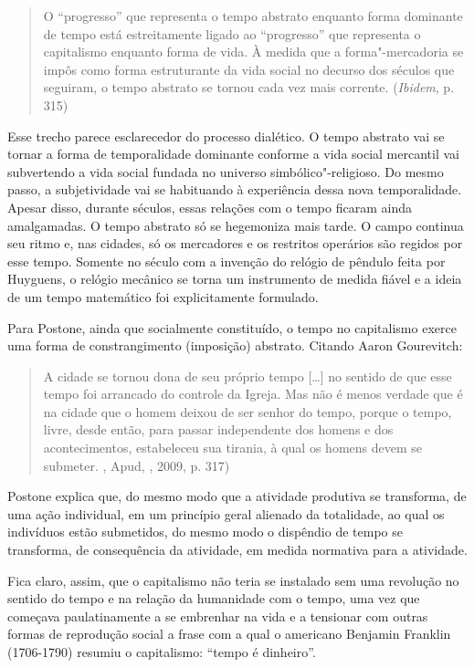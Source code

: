 \begin{quote}
O ``progresso'' que representa o tempo abstrato enquanto forma dominante
de tempo está estreitamente ligado ao ``progresso'' que representa o
capitalismo enquanto forma de vida. À medida que a forma"-mercadoria se
impôs como forma estruturante da vida social no decurso dos séculos que
seguiram, o tempo abstrato se tornou cada vez mais corrente.
(\emph{Ibidem}, p. 315)
\end{quote}

Esse trecho parece esclarecedor do processo dialético. O tempo abstrato
vai se tornar a forma de temporalidade dominante conforme a vida social
mercantil vai subvertendo a vida social fundada no universo
simbólico"-religioso. Do mesmo passo, a subjetividade vai se habituando à
experiência dessa nova temporalidade. Apesar disso, durante séculos,
essas relações com o tempo ficaram ainda amalgamadas. O tempo abstrato
só se hegemoniza mais tarde. O campo continua seu ritmo e, nas cidades,
só os mercadores e os restritos operários são regidos por esse tempo.
Somente no século  com a invenção do relógio de pêndulo feita por
Huyguens, o relógio mecânico se torna um instrumento de medida fiável e
a ideia de um tempo matemático foi explicitamente formulado.

Para Postone, ainda que socialmente constituído, o tempo no capitalismo
exerce uma forma de constrangimento (imposição) abstrato. Citando Aaron
Gourevitch:

\begin{quote}
A cidade se tornou dona de seu próprio tempo [\ldots{}] no sentido de que
esse tempo foi arrancado do controle da Igreja. Mas não é menos verdade
que é na cidade que o homem deixou de ser senhor do tempo, porque o
tempo, livre, desde então, para passar independente dos homens e dos
acontecimentos, estabeleceu sua tirania, à qual os homens devem se
submeter. , Apud, , 2009, p. 317)
\end{quote}

Postone explica que, do mesmo modo que a atividade produtiva se
transforma, de uma ação individual, em um princípio geral alienado da
totalidade, ao qual os indivíduos estão submetidos, do mesmo modo o
dispêndio de tempo se transforma, de consequência da atividade, em
medida normativa para a atividade.

Fica claro, assim, que o capitalismo não teria se instalado sem uma
revolução no sentido do tempo e na relação da humanidade com o tempo,
uma vez que começava paulatinamente a se embrenhar na vida e a tensionar
com outras formas de reprodução social a frase com a qual o americano
Benjamin Franklin (1706-1790) resumiu o capitalismo: ``tempo é
dinheiro''.

